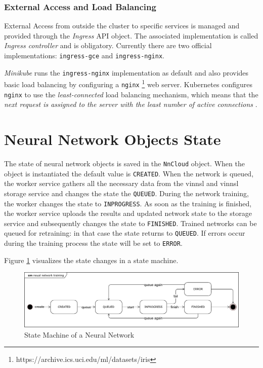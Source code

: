 \subsubsection{External Access and Load
Balancing}\label{external-access-and-load-balancing}

External Access from outside the cluster to specific services is managed
and provided through the \emph{Ingress} API object. The associated
implementation is called \emph{Ingress controller} and is obligatory.
Currently there are two official implementations: \texttt{ingress-gce}
and \texttt{ingress-nginx}. \cite{kub-ingress}

\emph{Minikube} runs the \texttt{ingress-nginx} implementation as
default and also provides basic load balancing by configuring a
\texttt{nginx} \footnote{https://archive.ics.uci.edu/ml/datasets/iris}
web server. Kubernetes configures \texttt{nginx} to use the
\emph{least-connected} load balancing mechanism, which means that the
\emph{next request is assigned to the server with the least number of
active connections} \cite{nginx-loadbal}.

\section{Neural Network Objects
State}\label{neural-network-objects-state}

The state of neural network objects is saved in the \texttt{NnCloud}
object. When the object is instantiated the default value is
\texttt{CREATED}. When the network is queued, the worker service gathers
all the necessary data from the vinnsl and vinnsl storage service and
changes the state the \texttt{QUEUED}. During the network training, the
worker changes the state to \texttt{INPROGRESS}. As soon as the training
is finished, the worker service uploads the results and updated network
state to the storage service and subsequently changes the state to
\texttt{FINISHED}. Trained networks can be queued for retraining: in
that case the state returns to \texttt{QUEUED}. If errors occur during
the training process the state will be set to \texttt{ERROR}.

Figure \ref{nn-states} visualizes the state changes in a state machine.

\begin{figure}
\centering
\includegraphics[width=15.00000cm]{images/nn-states}
\caption{State Machine of a Neural Network \label{nn-states}}
\end{figure}

